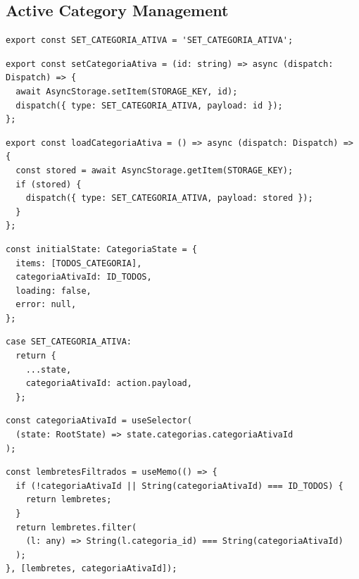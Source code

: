 \documentclass[runningheads,a4paper]{llncs}
\begin{document}
\subsection{Active Category Management}

\begin{lstlisting}[caption={Redux Action Constant}]
export const SET_CATEGORIA_ATIVA = 'SET_CATEGORIA_ATIVA';
\end{lstlisting}

\begin{lstlisting}[caption={Persisting Active Category Selection}]
export const setCategoriaAtiva = (id: string) => async (dispatch: Dispatch) => {
  await AsyncStorage.setItem(STORAGE_KEY, id);
  dispatch({ type: SET_CATEGORIA_ATIVA, payload: id });
};
\end{lstlisting}

\begin{lstlisting}[caption={Loading Persisted Active Category}]
export const loadCategoriaAtiva = () => async (dispatch: Dispatch) => {
  const stored = await AsyncStorage.getItem(STORAGE_KEY);
  if (stored) {
    dispatch({ type: SET_CATEGORIA_ATIVA, payload: stored });
  }
};
\end{lstlisting}

\begin{lstlisting}[caption={Category Reducer Initial State}]
const initialState: CategoriaState = {
  items: [TODOS_CATEGORIA],
  categoriaAtivaId: ID_TODOS,
  loading: false,
  error: null,
};
\end{lstlisting}

\begin{lstlisting}[caption={Handling Active Category Update in Reducer}]
case SET_CATEGORIA_ATIVA:
  return {
    ...state,
    categoriaAtivaId: action.payload,
  };
\end{lstlisting}

\begin{lstlisting}[caption={Selecting Active Category from Global State}]
const categoriaAtivaId = useSelector(
  (state: RootState) => state.categorias.categoriaAtivaId
);
\end{lstlisting}

\begin{lstlisting}[caption={Filtering Reminders by Active Category}]
const lembretesFiltrados = useMemo(() => {
  if (!categoriaAtivaId || String(categoriaAtivaId) === ID_TODOS) {
    return lembretes;
  }
  return lembretes.filter(
    (l: any) => String(l.categoria_id) === String(categoriaAtivaId)
  );
}, [lembretes, categoriaAtivaId]);
\end{lstlisting}
\end{document}
